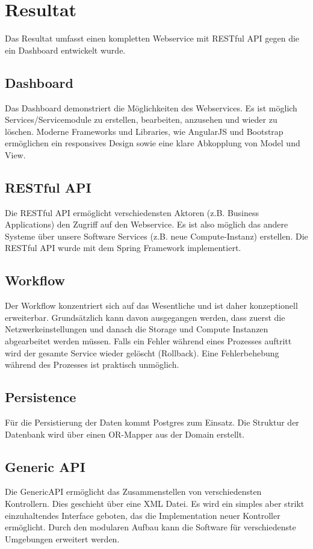 \chapter{Resultat}
Das Resultat umfasst einen kompletten Webservice mit RESTful API gegen die ein Dashboard entwickelt wurde.

\section{Dashboard}
Das Dashboard demonstriert die Möglichkeiten des Webservices. Es ist möglich Services/Servicemodule zu erstellen, bearbeiten, anzusehen und wieder zu löschen. Moderne Frameworks und Libraries, wie AngularJS und Bootstrap ermöglichen ein responsives Design sowie eine klare Abkopplung von Model und View.

\section{RESTful API}
Die RESTful API ermöglicht verschiedensten Aktoren (z.B. Business Applications) den Zugriff auf den Webservice. Es ist also möglich das andere Systeme über unsere Software Services (z.B. neue Compute-Instanz) erstellen. Die RESTful API wurde mit dem Spring Framework implementiert. 

\section{Workflow}
Der Workflow konzentriert sich auf das Wesentliche und ist daher konzeptionell erweiterbar. Grundsätzlich kann davon ausgegangen werden, dass zuerst die Netzwerkeinstellungen und danach die Storage und Compute Instanzen abgearbeitet werden müssen. Falls ein Fehler während eines Prozesses auftritt wird der gesamte Service wieder gelöscht (Rollback). Eine Fehlerbehebung während des Prozesses ist praktisch unmöglich.

\section{Persistence}
Für die Persistierung der Daten kommt Postgres zum Einsatz. Die Struktur der Datenbank wird über einen OR-Mapper aus der Domain erstellt. 

\section{Generic API}
Die GenericAPI ermöglicht das Zusammenstellen von verschiedensten Kontrollern. Dies geschieht über eine XML Datei. Es wird ein simples aber strikt einzuhaltendes Interface geboten, das die Implementation neuer Kontroller ermöglicht. Durch den modularen Aufbau kann die Software für verschiedenste Umgebungen erweitert werden.